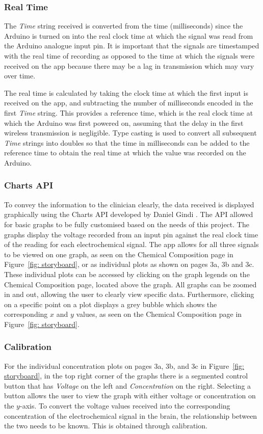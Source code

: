 \subsubsection{Real Time} \label{section: real time}
The \textit{Time} string received is converted from the time (milliseconds) since the Arduino is turned on into the real clock time at which the signal was read from the Arduino analogue input pin. It is important that the signals are timestamped with the real time of recording as opposed to the time at which the signals were received on the app because there may be a lag in transmission which may vary over time.

The real time is calculated by taking the clock time at which the first input is received on the app, and subtracting the number of milliseconds encoded in the first \textit{Time} string. This provides a reference time, which is the real clock time at which the Arduino was first powered on, assuming that the delay in the first wireless transmission is negligible. Type casting is used to convert all subsequent \textit{Time} strings into doubles so that the time in milliseconds can be added to the reference time to obtain the real time at which the value was recorded on the Arduino.


\subsubsection{Charts API}
To convey the information to the clinician clearly, the data received is displayed graphically using the Charts API developed by Daniel Gindi \cite{Charts}. The API allowed for basic graphs to be fully customised based on the needs of this project. The graphs display the voltage recorded from an input pin against the real clock time of the reading for each electrochemical signal. The app allows for all three signals to be viewed on one graph, as seen on the Chemical Composition page in Figure~\ref{fig: storyboard}, or as individual plots as shown on pages 3a, 3b and 3c. These individual plots can be accessed by clicking on the graph legends on the Chemical Composition page, located above the graph. All graphs can be zoomed in and out, allowing the user to clearly view specific data. Furthermore, clicking on a specific point on a plot displays a grey bubble which shows the corresponding $x$ and $y$ values, as seen on the Chemical Composition page in Figure~\ref{fig: storyboard}.


\subsubsection{Calibration}
For the individual concentration plots on pages 3a, 3b, and 3c in Figure~\ref{fig: storyboard}, in the top right corner of the graphs there is a segmented control button that has \textit{Voltage} on the left and \textit{Concentration} on the right. Selecting a button allows the user to view the graph with either voltage or concentration on the $y$-axis. To convert the voltage values received into the corresponding concentration of the electrochemical signal in the brain, the relationship between the two needs to be known. This is obtained through calibration. 

